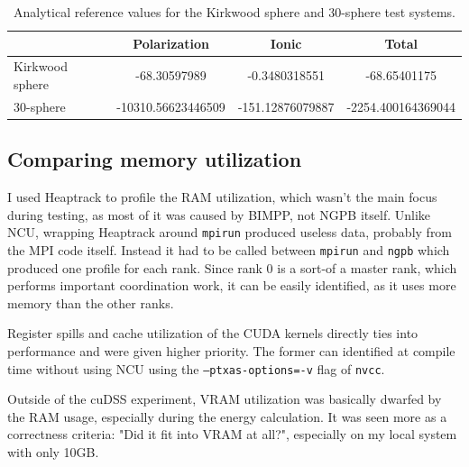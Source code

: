 \begin{table}[htbp]
    \centering
    \begin{tabular}{lccc}
        \toprule
         & Polarization & Ionic & Total \\
        \midrule
        Kirkwood sphere & -68.30597989 & -0.3480318551 & -68.65401175 \\
        30-sphere       & -10310.56623446509 & -151.12876079887 & -2254.400164369044 \\
        \bottomrule
    \end{tabular}
    \caption{Analytical reference values for the Kirkwood sphere and 30-sphere test systems.}
    \label{tab:ngpb-analytical-values}
\end{table}

\subsection{Comparing memory utilization}
\label{sec:evaluation-experimental-setup-comparing-memory-utilization}

I used Heaptrack to profile the RAM utilization, which wasn't the main focus during testing, as most of it was caused by BIMPP, not NGPB itself.
Unlike NCU, wrapping Heaptrack around \texttt{mpirun} produced useless data, probably from the MPI code itself. 
Instead it had to be called between \texttt{mpirun} and \texttt{ngpb} which produced one profile for each rank. 
Since rank 0 is a sort-of a master rank, which performs important coordination work, it can be easily identified, as it uses more memory than the other ranks.

Register spills and cache utilization of the CUDA kernels directly ties into performance and were given higher priority.
The former can identified at compile time without using NCU using the \texttt{--ptxas-options=-v} flag of \texttt{nvcc}.

Outside of the cuDSS experiment, VRAM utilization was basically dwarfed by the RAM usage, especially during the energy calculation. 
It was seen more as a correctness criteria: "Did it fit into VRAM at all?", especially on my local system with only 10GB.